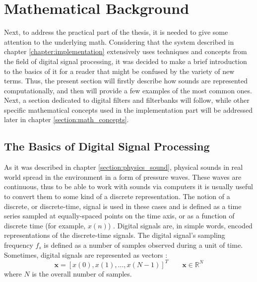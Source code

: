 \section{Mathematical Background}\label{chapter:math}

Next, to address the practical part of the thesis, it is needed to give some attention to the underlying math. Considering that the system described in chapter \ref{chapter:implementation} extensively uses techniques and concepts from the field of digital signal processing, it was decided to make a brief introduction to the basics of it for a reader that might be confused by the variety of new terms. Thus, the present section will firstly describe how sounds are represented computationally, and then will provide a few examples of the most common ones. Next, a section dedicated to digital filters and filterbanks will follow, while other specific mathematical concepts used in the implementation part will be addressed later in chapter \ref{section:math_concepts}.

\subsection{The Basics of Digital Signal Processing}\label{section:math_basics}

As it was described in chapter \ref{section:physics_sound}, physical sounds in real world spread in the environment in a form of pressure waves. These waves are continuous, thus to be able to work with sounds via computers it is usually useful to convert them to some kind of a discrete representation. The notion of a discrete, or discrete-time, signal is used in these cases and is defined as a time series sampled at equally-spaced points on the time axis, or as a function of discrete time (for example, $x(n)$) \cite{Shenoi2005}. Digital signals are, in simple words, encoded representations of the discrete-time signals. The digital signal's sampling frequency $f_s$ is defined as a number of samples observed during a unit of time. Sometimes, digital signals are represented as vectors \cite{Abood2020}: \begin{equation}
	\textbf{x} = [x(0), x(1), \dots{}, x(N - 1)]^T\qquad\textbf{x}\in\mathbb{R}^N
\end{equation}
where $N$ is the overall number of samples.\\

